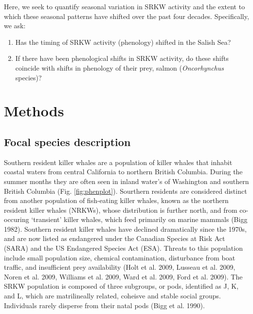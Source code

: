 \documentclass{article}
\begin{document}
\par Here, we seek to quantify seasonal variation in SRKW activity and the extent to which these seasonal patterns have shifted over the past four decades.  %
Specifically, we ask:
\begin{enumerate}
\item Has the timing of SRKW activity (phenology) shifted in the Salish Sea? 
\item If there have been phenological shifts in SRKW activity, do these shifts coincide with shifts in phenology of their prey, salmon (\emph{Oncorhynchus} species)?
\end{enumerate}

\section* {Methods}
\subsection*{Focal species description}
Southern resident killer whales are a population of killer whales that inhabit coastal waters from central California to northern British Columbia.  During the summer months they are often seen in inland water's of Washington and southern British Columbia (Fig. \ref{fig:phenplot}). Sourthern residents are considered distinct from another population of fish-eating killer whales, known as the northern resident killer whales (NRKWs), whose distribution is further north, and from co-occuring `transient' killer whales, which feed primarily on marine mammals (Bigg 1982). Southern resident killer whales have declined dramatically since the 1970s, and are now listed as endangered under the Canadian Species at Risk Act (SARA) and the US Endangered Species Act (ESA). Threats to this population include small population size, chemical contamination, disturbance from boat traffic, and insufficient prey availability (Holt et al. 2009, Lusseau et al. 2009, Noren et al. 2009, Williams et al. 2009, Ward et al. 2009, Ford et al. 2009). The SRKW population is composed of three subgroups, or pods, identified as J, K, and L, which are matrilineally related, coheisve and stable social groups. Individuals rarely disperse from their natal pods (Bigg et al. 1990).
\end{document}
